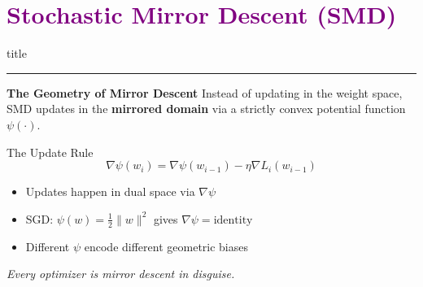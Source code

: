 \documentclass[aspectratio=169]{beamer}
\begin{document}
\section{\textbf{\textcolor{purple}{Stochastic Mirror Descent (SMD)}}}
\begin{frame}[plain]
    \vfill
    \centering
    \begin{beamercolorbox}[sep=8pt,center,shadow=true,rounded=true]{title}
        \insertsectionhead\par%
        \color{oxfordblue}\noindent\rule{10cm}{1pt}
    \end{beamercolorbox}
    \vfill
\end{frame}

\begin{frame}{\textcolor{cmindsblue}{\textbf{The Geometry of Mirror Descent}}}
    Instead of updating in the weight space, SMD updates in the \textbf{mirrored domain} via a strictly convex potential function $\psi(\cdot)$.
    
    \begin{block}{The Update Rule}
        \begin{equation}
            \nabla\psi(w_i) = \nabla\psi(w_{i-1}) - \eta\nabla L_i(w_{i-1})
        \end{equation}
    \end{block}

    \begin{itemize}
        \item Updates happen in dual space via $\nabla\psi$
        \item SGD: $\psi(w) = \frac{1}{2}\|w\|^2$ gives $\nabla\psi = \text{identity}$
        \item Different $\psi$ encode different geometric biases
    \end{itemize}
    
    \vspace{0.2cm}
    \textit{Every optimizer is mirror descent in disguise.}
\end{frame}
\end{document}
